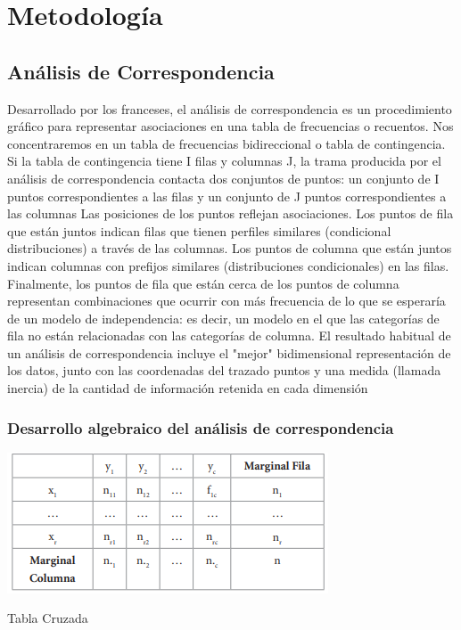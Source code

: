 \documentclass[11pt,letter]{article}
\begin{document}
\section{Metodología}
\subsection{Análisis de Correspondencia}
Desarrollado por los franceses, el análisis de correspondencia es un procedimiento gráfico para representar
asociaciones en una tabla de frecuencias o recuentos. Nos concentraremos en un
tabla de frecuencias bidireccional o tabla de contingencia. Si la tabla de contingencia tiene I
filas y columnas J, la trama producida por el análisis de correspondencia contacta dos conjuntos
de puntos: un conjunto de I puntos correspondientes a las filas y un conjunto de J puntos correspondientes
a las columnas Las posiciones de los puntos reflejan asociaciones.
Los puntos de fila que están juntos indican filas que tienen perfiles similares (condicional
distribuciones) a través de las columnas. Los puntos de columna que están juntos indican
columnas con prefijos similares (distribuciones condicionales) en las filas.
Finalmente, los puntos de fila que están cerca de los puntos de columna representan combinaciones que
ocurrir con más frecuencia de lo que se esperaría de un modelo de independencia:
es decir, un modelo en el que las categorías de fila no están relacionadas con las categorías de columna.
El resultado habitual de un análisis de correspondencia incluye el "mejor" bidimensional
representación de los datos, junto con las coordenadas del trazado
puntos y una medida (llamada inercia) de la cantidad de información retenida en
cada dimensión\autocite{jhonson}
\subsubsection{Desarrollo algebraico del análisis de correspondencia}

\begin{table}[!htb]
    \includegraphics{tabla_corres.png}
    \caption{Tabla Cruzada}
    \label{tab1}
\end{table}
\end{document}
